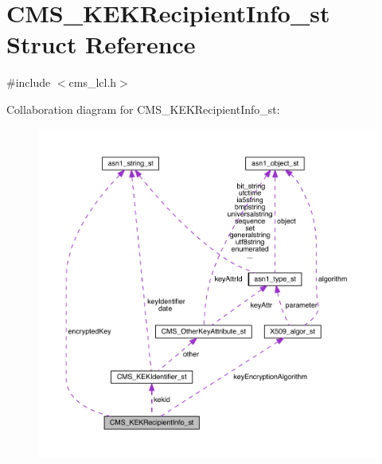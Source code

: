 \hypertarget{struct_c_m_s___k_e_k_recipient_info__st}{}\section{C\+M\+S\+\_\+\+K\+E\+K\+Recipient\+Info\+\_\+st Struct Reference}
\label{struct_c_m_s___k_e_k_recipient_info__st}


{\ttfamily \#include $<$cms\+\_\+lcl.\+h$>$}



Collaboration diagram for C\+M\+S\+\_\+\+K\+E\+K\+Recipient\+Info\+\_\+st\+:\nopagebreak
\begin{figure}[H]
\begin{center}
\leavevmode
\includegraphics[width=350pt]{struct_c_m_s___k_e_k_recipient_info__st__coll__graph}
\end{center}
\end{figure}

